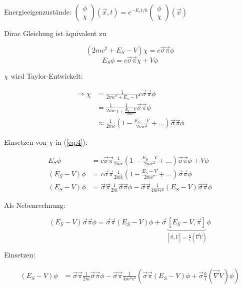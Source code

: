 Energieeigenzustände: \(\begin{pmatrix}\phi\\\chi\end{pmatrix} (\vec x,t) = e^{-E_st/\hbar}\begin{pmatrix}\phi\\\chi\end{pmatrix} (\vec x) \)

Dirac Gleichung ist äquivalent zu


\begin{equation}
  \label{eq:3}
  (2mc^2+E_S-V)\chi = c\vec\sigma\vec\pi\phi
\end{equation}
\begin{equation}
  \label{eq:4}
E_S\phi = c\vec\sigma\vec\pi\chi + V\phi  
\end{equation}



\(\chi\) wird Taylor-Entwickelt:

\begin{align}
\Rightarrow \chi &= \frac{1}{2mc^2+E_S-V}c\vec\sigma\vec\pi\phi \\
&= \frac{1}{2mc}\frac{1}{1 + \frac{E_S-V}{2mc^2}}\vec\sigma\vec\pi\phi \\
&\approx \frac{1}{2mc} (1-\frac{E_S-V}{2mc^2} +...)\vec\sigma\vec\pi\phi
\end{align}

Einsetzen von \(\chi\) in (\ref{eq:4}):

\begin{align}
  \label{eq:5}
E_S\phi &= c\vec\sigma\vec\pi \frac{1}{2mc} (1-\frac{E_S-V}{2mc^2} +...)\vec\sigma\vec\pi\phi  + V\phi \\
(E_S-V)\phi &= c\vec\sigma\vec\pi \frac{1}{2mc} (1-\frac{E_S-V}{2mc^2} +...)\vec\sigma\vec\pi\phi \\
(E_S-V)\phi &= \vec\sigma\vec\pi \frac{1}{2m}\vec\sigma\vec\pi\phi -\vec\sigma\vec\pi \frac{1}{4m^2c^2} (E_S-V)\vec\sigma\vec\pi\phi 
\end{align}

Als Nebenrechnung:


\[(E_S-V)\vec\sigma\vec\pi\phi =\vec\sigma\vec\pi(E_S-V)\phi + \vec\sigma\underbrace{[E_S-V,\vec\pi]}_{[\vec\pi,V]=\frac{\hbar}{i}(\vec\nabla V)}\phi \]

Einsetzen:


\begin{align}
(E_S-V)\phi &= \vec\sigma\vec\pi \frac{1}{2m}\vec\sigma\vec\pi\phi -\vec\sigma\vec\pi \frac{1}{4m^2c^2}\left( \vec\sigma\vec\pi(E_S-V)\phi +\vec\sigma\frac{\hbar}{i}(\vec\nabla V)\phi\right)
\end{align}

